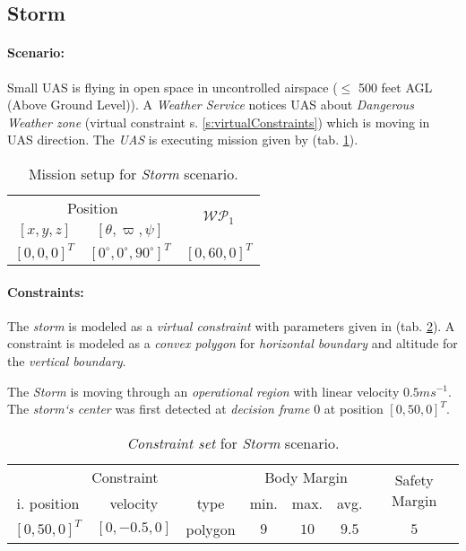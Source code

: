 \subsection{Storm}\label{s:testStorm}
    \paragraph{Scenario:} Small UAS is flying in open space in uncontrolled airspace ($\le$ 500 feet AGL (Above Ground Level)). A \emph{Weather Service} notices UAS about \emph{Dangerous Weather zone} (virtual constraint s. \ref{s:virtualConstraints}) which is moving in UAS direction. The \emph{UAS} is  executing mission given by (tab. \ref{tab:missionSetupStormScenario}).
    
    \begin{table}[H]
        \centering
        \begin{tabular}{c|c||c}
            \multicolumn{2}{c||}{Position} & \multirow{2}{*}{$\mathscr{WP}_1$} \\\cline{1-2}
            $[x,y,z]$           & $[\theta,\varpi,\psi]$           & \\\hline\hline
            $[0,0,0]^T $        & $[0^\circ,0^\circ,90^\circ]^T$    & $[0,60,0]^T$        \\ 
        \end{tabular}
        \caption{Mission setup for \emph{Storm} scenario.}
        \label{tab:missionSetupStormScenario}
    \end{table}
    
    \paragraph{Constraints:} The \emph{storm} is modeled as a \emph{virtual constraint} with parameters given in (tab. \ref{tab:obstacleSetStorm}). A constraint is modeled as a \emph{convex polygon} for \emph{horizontal boundary} and altitude for the \emph{vertical boundary}.
    
    The \emph{Storm} is moving through an \emph{operational region} with linear velocity $0.5 ms^{-1}$. The \emph{storm`s center} was first detected at \emph{decision frame} $0$ at position $[0,50,0]^T$.
    
    \begin{table}[H]
        \centering
        \begin{tabular}{c|c|c|c|c|c|c}
            \multicolumn{3}{c|}{Constraint} & \multicolumn{3}{c|}{Body Margin} & \multirow{2}{*}{Safety Margin}\\\cline{1-6}
            i. position & velocity & type & min. & max. & avg. &   \\\hline\hline
            $[0,50,0]^T$ & $[0,-0.5,0]$ & polygon & $9$ & $10$ & $9.5$  & $5$ \\
         \end{tabular}
        \caption{\emph{Constraint set} for \emph{Storm} scenario.}
        \label{tab:obstacleSetStorm}
    \end{table}
    
